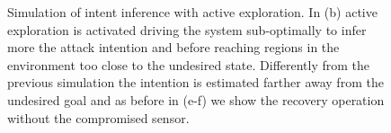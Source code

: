 \documentclass[letterpaper, 10 pt, conference]{ieeeconf}  %
\begin{document}
\begin{figure}[]
	\centering
	\vspace{-5pt}
	\caption{Simulation of intent inference with active exploration. In (b) active exploration is activated driving the system sub-optimally to infer more the attack intention and before reaching regions in the environment too close to the undesired state. Differently from the previous simulation the intention is estimated farther away from the undesired goal and as before in (e-f) we show the recovery operation without the compromised sensor.}
	\label{fig:active-exploration}
\end{figure}
\end{document}
